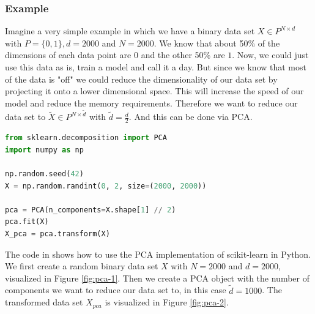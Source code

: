 \subsubsection{Example}
Imagine a very simple example in which we have a binary data set $X \in P^{N \times d}$ with $P = \{0, 1\}, d = 2000$ and $N = 2000$.
We know that about 50\% of the dimensions of each data point are $0$ and the other 50\% are $1$.
Now, we could just use this data as is, train a model and call it a day.
But since we know that most of the data is "off" we could reduce the dimensionality of our data set by projecting it onto a lower dimensional space.
This will increase the speed of our model and reduce the memory requirements.
Therefore we want to reduce our data set to $\tilde{X} \in P^{N \times \tilde{d}}$ with $\tilde{d} = \frac{d}{2}$.
And this can be done via PCA.
\begin{lstlisting}[language=Python, caption={PCA in Python}, label={code:pca}]
from sklearn.decomposition import PCA
import numpy as np

np.random.seed(42)
X = np.random.randint(0, 2, size=(2000, 2000))

pca = PCA(n_components=X.shape[1] // 2)
pca.fit(X)
X_pca = pca.transform(X)
\end{lstlisting}
The code in  shows how to use the PCA implementation of scikit-learn in Python.
We first create a random binary data set $X$ with $N = 2000$ and $d = 2000$, visualized in Figure \ref{fig:pca-1}.
Then we create a PCA object with the number of components we want to reduce our data set to, in this case $\tilde{d} = 1000$.
The transformed data set $X_{pca}$ is visualized in Figure \ref{fig:pca-2}.

